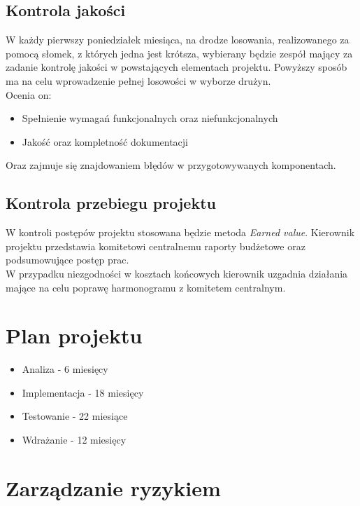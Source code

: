 \documentclass[12pt]{article}
\begin{document}
\subsection{Kontrola jakości}
W każdy pierwszy poniedziałek miesiąca, na drodze losowania, realizowanego za pomocą słomek, z których jedna jest krótsza, wybierany będzie zespół mający za zadanie kontrolę jakości w powstających elementach projektu. Powyższy sposób ma na celu wprowadzenie pełnej losowości w wyborze drużyn.\\
Ocenia on:
\begin{itemize}
\item Spełnienie wymagań funkcjonalnych oraz niefunkcjonalnych
\item Jakość oraz kompletność dokumentacji
\end{itemize}
Oraz zajmuje się znajdowaniem błędów w przygotowywanych komponentach.
\subsection{Kontrola przebiegu projektu}
W kontroli postępów projektu stosowana będzie metoda \textit{Earned value}.
Kierownik projektu przedstawia komitetowi centralnemu raporty budżetowe oraz podsumowujące postęp prac.\\
W przypadku niezgodności w kosztach końcowych kierownik uzgadnia działania mające na celu poprawę harmonogramu z komitetem centralnym.

\newpage
\section{Plan projektu}
\begin{itemize}
\item Analiza - 6 miesięcy
\item Implementacja - 18 miesięcy
\item Testowanie - 22 miesiące
\item Wdrażanie - 12 miesięcy
\end{itemize}

\newpage
\section{Zarządzanie ryzykiem}
\end{document}
